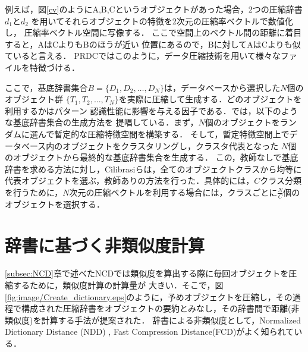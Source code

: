 例えば，図\ref{cv}のようにA,B,Cというオブジェクトがあった場合，2つの圧縮辞書$d_1$と$d_2$
を用いてそれらオブジェクトの特徴を2次元の圧縮率ベクトルで数値化し，
圧縮率ベクトル空間に写像する．
ここで空間上のベクトル間の距離に着目すると，AはCよりもBのほうが近い
位置にあるので，Bに対してAはCよりも似ていると言える．
PRDCではこのように，データ圧縮技術を用いて様々なファイルを特徴づける．


ここで，基底辞書集合$B=\{D_1,D_2,\dots,D_N\}$は，データベースから選択した$N$個のオブジェクト群
$\{T_1,T_2,\dots,T_N\}$を実際に圧縮して生成する．どのオブジェクトを利用するかはパターン
認識性能に影響を与える因子である．\cite{PRDC}では，以下のような基底辞書集合の生成方法を
提唱している．まず，$N$個のオブジェクトをランダムに選んで暫定的な圧縮特徴空間を構築する．
そして，暫定特徴空間上でデータベース内のオブジェクトをクラスタリングし，クラスタ代表となった
$N$個のオブジェクトから最終的な基底辞書集合を生成する．
この，教師なしで基底辞書を求める方法に対し，Cilibrasiら\cite{cilibrasi2007statistical}は，全てのオブジェクトクラスから均等に代表オブジェクトを選ぶ，教師ありの方法を行った．具体的には，$C$クラス分類を行うために，$N$次元の圧縮ベクトルを利用する場合には，クラスごとに$\frac{N}{C}$個のオブジェクトを選択する．

\section{辞書に基づく非類似度計算}
\ref{subsec:NCD}章で述べたNCDでは類似度を算出する際に毎回オブジェクトを圧縮するために，類似度計算の計算量が
大きい．そこで，図\ref{fig:image/Create_dictionary.eps}のように，予めオブジェクトを圧縮し，その過程で構成された圧縮辞書をオブジェクトの要約とみなし，その辞書間で距離(非類似度)を計算する手法が提案された．
辞書による非類似度として，Normalized Dictionary Distance (NDD) \cite{NDD}, Fast Compression Distance(FCD)\cite{cerra2012fast}がよく知られている．

